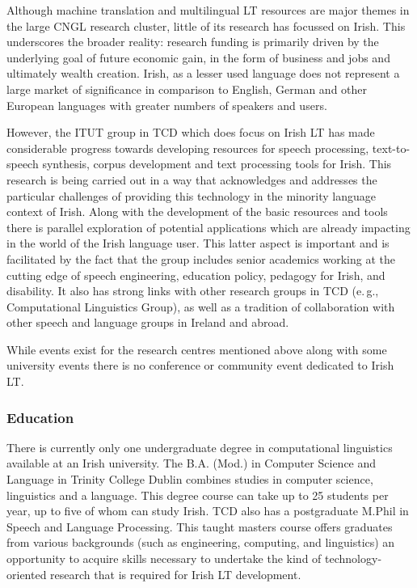 \begin{multicols}{2}
Although machine translation and multilingual LT resources are major themes in the large CNGL research cluster, little of its research has focussed on Irish. This underscores the broader reality: research funding is primarily driven by the underlying goal of future economic gain, in the form of business and jobs and ultimately wealth creation. Irish, as a lesser used language does not represent a large market of significance in comparison to English, German and other European languages with greater numbers of speakers and users.

However, the ITUT group in TCD which does focus on Irish LT has made considerable progress towards developing resources for speech processing, text-to-speech synthesis, corpus development and text processing tools for Irish. This research is being carried out in a way that acknowledges and addresses the particular challenges of providing this technology in the minority language context of Irish. Along with the development of the basic resources and tools there is parallel exploration of potential applications which are already impacting in the world of the Irish language user. This latter aspect is important and is facilitated by the fact that the group includes senior academics working at the cutting edge of speech engineering, education policy, pedagogy for Irish, and disability.  It also has strong links with other research groups in TCD (e.\,g., Computational Linguistics Group), as well as a tradition of collaboration with other speech and language groups in Ireland and abroad.

While events exist for the research centres mentioned above along with some university events there is no conference or community event dedicated to Irish LT.


\subsubsection{Education}
There is currently only one undergraduate degree in computational linguistics available at an Irish university. The B.A. (Mod.) in Computer Science  and Language in Trinity College Dublin combines studies in computer science, linguistics and a language. This degree course can take up to  25 students per year, up to five of whom can study Irish. TCD also has a postgraduate M.Phil in Speech and Language Processing. This taught masters course offers graduates from various backgrounds (such as engineering, computing, and linguistics) an opportunity to acquire skills necessary to undertake the kind of technology-oriented research that is required for Irish LT development.  


\end{multicols}
